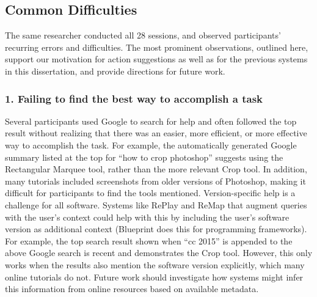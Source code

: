 \subsection{Common Difficulties}
The same researcher conducted all 28 sessions, and observed participants' recurring errors and difficulties. The most prominent observations, outlined here, support our motivation for action suggestions as well as for the previous systems in this dissertation, and provide directions for future work.

\subsubsection{1. Failing to find the best way to accomplish a task}
Several participants used Google to search for help and often followed the top result without realizing that there was an easier, more efficient, or more effective way to accomplish the task. For example, the automatically generated Google summary listed at the top for ``how to crop photoshop'' suggests using the Rectangular Marquee tool, rather than the more relevant Crop tool. In addition, many tutorials included screenshots from older versions of Photoshop, making it difficult for participants to find the tools mentioned. Version-specific help is a challenge for all software. Systems like RePlay and ReMap that augment queries with the user's context could help with this by including the user's software version as additional context (Blueprint \cite{Brandt2010} does this for programming frameworks). For example, the top search result shown when ``cc 2015'' is appended to the above Google search is recent and demonstrates the Crop tool. However, this only works when the results also mention the software version explicitly, which many online tutorials do not. Future work should investigate how systems might infer this information from online resources based on available metadata.

